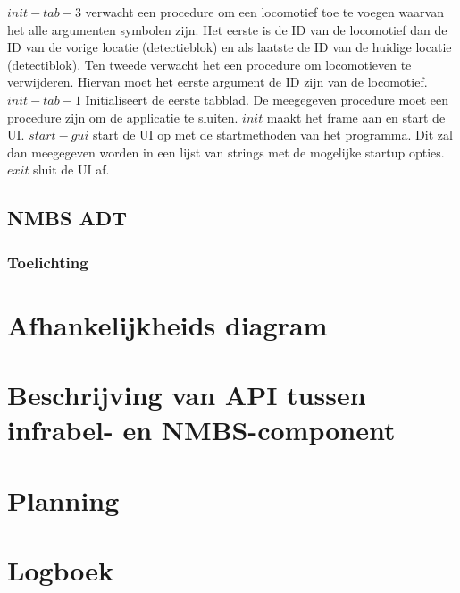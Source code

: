 \documentclass{article}
\begin{document}
$init-tab-3$ verwacht een procedure om een locomotief toe te voegen waarvan het alle argumenten symbolen zijn. Het eerste is de ID van de locomotief dan de ID van de vorige locatie (detectieblok) en als 
laatste de ID van de huidige locatie (detectiblok). Ten tweede verwacht het een procedure om locomotieven
te verwijderen. Hiervan moet het eerste argument de ID zijn van de locomotief. $init-tab-1$ Initialiseert 
de eerste tabblad. De meegegeven procedure moet een procedure zijn om de applicatie te sluiten. $init$ maakt het frame aan en start
de UI. $start-gui$ start de UI op met de startmethoden van het programma. Dit zal dan meegegeven worden in een lijst van strings met de mogelijke startup opties.
$exit$ sluit de UI af. 
\subsection{NMBS ADT}

\subsubsection{Toelichting}
\section{Afhankelijkheids diagram}
\section{Beschrijving van API tussen infrabel- en NMBS-component}
\section{Planning}
\section{Logboek}
\end{document}
